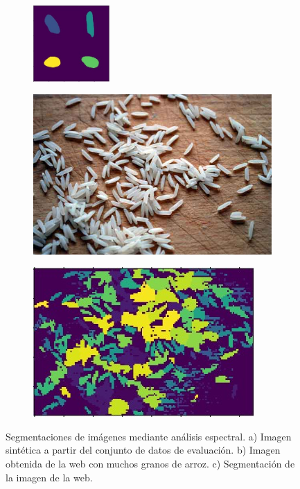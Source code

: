 \documentclass{article}
\begin{document}
\begin{figure} [!htb]
	\centering
	\begin{subfigure}[c]{0.3\textwidth}
	   \includegraphics[height=2.9cm]{fg/spectral_clustering.jpg}
      \caption{}
      \label{fg:espectral_granos}
    \end{subfigure}
    \begin{subfigure}[c]{0.3\textwidth}
	   \includegraphics[width= 2.9 cm,height= 2.9 cm]{fg/muchos_basmati.jpg}
      \caption{}
      \label{fg:espectral_web}
	\end{subfigure}
	\begin{subfigure}[c]{0.3\textwidth}
	   \includegraphics[width= 2.9 cm,height= 2.9 cm]{fg/muchos_basmati_spectral.jpg}
      \caption{}
      \label{fg:espectral_web_segmentada}
	\end{subfigure}
	\caption{Segmentaciones de imágenes mediante análisis espectral. a) Imagen sintética a partir del conjunto de datos de evaluación. b) Imagen obtenida de la web con muchos granos de arroz. c) Segmentación de la imagen de la web.}	
\label{fg:espectral}
\end{figure}
\end{document}
